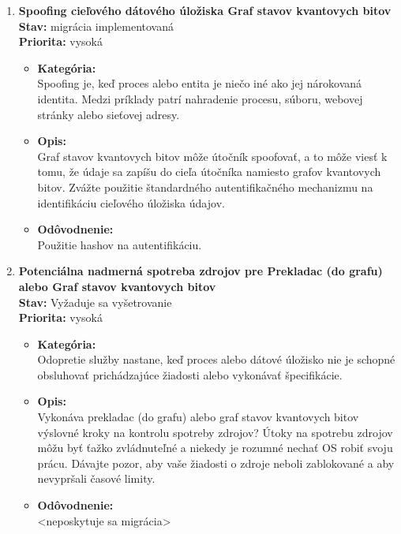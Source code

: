 \begin{enumerate}

\item \textbf{Spoofing cieľového dátového úložiska Graf stavov kvantovych bitov} \\ 
\textbf{Stav:} migrácia implementovaná \\
\textbf{Priorita:} vysoká
\begin{itemize}

\item[] \textbf{Kategória:} \\
Spoofing je, keď proces alebo entita je niečo iné ako jej nárokovaná identita. Medzi príklady patrí nahradenie procesu, súboru, webovej stránky alebo sieťovej adresy.
\item[] \textbf{Opis:} \\
Graf stavov kvantovych bitov môže útočník spoofovať, a to môže viesť k tomu, že údaje sa zapíšu do cieľa útočníka namiesto grafov kvantovych bitov. Zvážte použitie štandardného autentifikačného mechanizmu na identifikáciu cieľového úložiska údajov.
\item[] \textbf{Odôvodnenie:} \\
Použitie hashov na autentifikáciu.
\end{itemize}

\item \textbf{Potenciálna nadmerná spotreba zdrojov pre Prekladac (do grafu) alebo Graf stavov kvantovych bitov} \\
\textbf{Stav:} Vyžaduje sa vyšetrovanie \\
\textbf{Priorita:} vysoká 

\begin{itemize}
\item[] \textbf{Kategória:} \\
Odopretie služby nastane, keď proces alebo dátové úložisko nie je schopné obsluhovať prichádzajúce žiadosti alebo vykonávať špecifikácie.
\item[] \textbf{Opis:}  \\
Vykonáva prekladac (do grafu) alebo graf stavov kvantovych bitov výslovné kroky na kontrolu spotreby zdrojov? Útoky na spotrebu zdrojov môžu byť ťažko zvládnuteľné a niekedy je rozumné nechať OS robiť svoju prácu. Dávajte pozor, aby vaše žiadosti o zdroje neboli zablokované a aby nevypršali časové limity.
\item[] \textbf{Odôvodnenie:} \\
<neposkytuje sa migrácia>
\end{itemize}


\end{enumerate}
